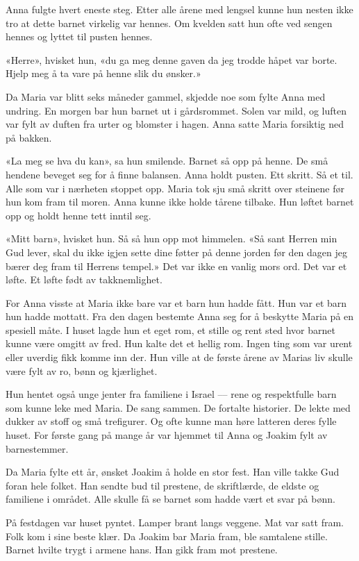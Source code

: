 Anna fulgte hvert eneste steg.
Etter alle årene med lengsel kunne hun nesten ikke tro at
dette barnet virkelig var hennes.
Om kvelden satt hun ofte ved sengen hennes og lyttet til pusten hennes.

«Herre», hvisket hun, «du ga meg denne gaven da jeg trodde håpet var borte.
Hjelp meg å ta vare på henne slik du ønsker.»

Da Maria var blitt seks måneder gammel, skjedde noe som fylte Anna med undring.
En morgen bar hun barnet ut i gårdsrommet.
Solen var mild, og luften var fylt av duften fra urter og blomster i hagen.
Anna satte Maria forsiktig ned på bakken.

«La meg se hva du kan», sa hun smilende.
Barnet så opp på henne.
De små hendene beveget seg for å finne balansen.
Anna holdt pusten. Ett skritt. Så et til.
Alle som var i nærheten stoppet opp.
Maria tok sju små skritt over steinene før hun kom fram til moren.
Anna kunne ikke holde tårene tilbake.
Hun løftet barnet opp og holdt henne tett inntil seg.

«Mitt barn», hvisket hun.
Så så hun opp mot himmelen.
«Så sant Herren min Gud lever, skal du ikke igjen sette
dine føtter på denne jorden før den dagen jeg
bærer deg fram til Herrens tempel.»
Det var ikke en vanlig mors ord.
Det var et løfte.
Et løfte født av takknemlighet.

For Anna visste at Maria ikke bare var et barn hun hadde fått.
Hun var et barn hun hadde mottatt.
Fra den dagen bestemte Anna seg for å beskytte Maria på en spesiell måte.
I huset lagde hun et eget rom, et stille og
rent sted hvor barnet kunne være omgitt av fred.
Hun kalte det et hellig rom.
Ingen ting som var urent eller uverdig fikk komme inn der.
Hun ville at de første årene av Marias liv skulle være fylt av ro,
bønn og kjærlighet.

Hun hentet også unge jenter fra familiene i Israel –--
rene og respektfulle barn som kunne leke med Maria.
De sang sammen.
De fortalte historier.
De lekte med dukker av stoff og små trefigurer.
Og ofte kunne man høre latteren deres fylle huset.
For første gang på mange år var hjemmet til Anna og
Joakim fylt av barnestemmer.

Da Maria fylte ett år, ønsket Joakim å holde en stor fest.
Han ville takke Gud foran hele folket.
Han sendte bud til prestene, de skriftlærde, de eldste og familiene i området.
Alle skulle få se barnet som hadde vært et svar på bønn.

På festdagen var huset pyntet.
Lamper brant langs veggene.
Mat var satt fram.
Folk kom i sine beste klær.
Da Joakim bar Maria fram, ble samtalene stille.
Barnet hvilte trygt i armene hans.
Han gikk fram mot prestene.

